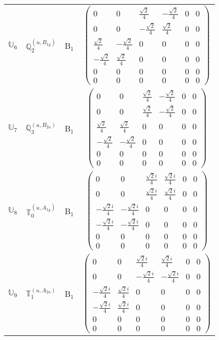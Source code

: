 \documentclass[fleqn,10pt,landscape]{article}
\begin{document}
\begin{itemize}
\begin{center}
\begin{longtable}{c|c|c|c}
$ \mathbb{U}_{6} $ & $\mathbb{Q}_{2}^{(u,B_{1g})}$ & B$_{1}$ & $\begin{pmatrix} 0 & 0 & \frac{\sqrt{2}}{4} & - \frac{\sqrt{2}}{4} & 0 & 0 \\ 0 & 0 & - \frac{\sqrt{2}}{4} & \frac{\sqrt{2}}{4} & 0 & 0 \\ \frac{\sqrt{2}}{4} & - \frac{\sqrt{2}}{4} & 0 & 0 & 0 & 0 \\ - \frac{\sqrt{2}}{4} & \frac{\sqrt{2}}{4} & 0 & 0 & 0 & 0 \\ 0 & 0 & 0 & 0 & 0 & 0 \\ 0 & 0 & 0 & 0 & 0 & 0 \end{pmatrix}$ \\
$ \mathbb{U}_{7} $ & $\mathbb{Q}_{3}^{(u,B_{2u})}$ & B$_{1}$ & $\begin{pmatrix} 0 & 0 & \frac{\sqrt{2}}{4} & - \frac{\sqrt{2}}{4} & 0 & 0 \\ 0 & 0 & \frac{\sqrt{2}}{4} & - \frac{\sqrt{2}}{4} & 0 & 0 \\ \frac{\sqrt{2}}{4} & \frac{\sqrt{2}}{4} & 0 & 0 & 0 & 0 \\ - \frac{\sqrt{2}}{4} & - \frac{\sqrt{2}}{4} & 0 & 0 & 0 & 0 \\ 0 & 0 & 0 & 0 & 0 & 0 \\ 0 & 0 & 0 & 0 & 0 & 0 \end{pmatrix}$ \\
$ \mathbb{U}_{8} $ & $\mathbb{T}_{0}^{(u,A_{1g})}$ & B$_{1}$ & $\begin{pmatrix} 0 & 0 & \frac{\sqrt{2} i}{4} & \frac{\sqrt{2} i}{4} & 0 & 0 \\ 0 & 0 & \frac{\sqrt{2} i}{4} & \frac{\sqrt{2} i}{4} & 0 & 0 \\ - \frac{\sqrt{2} i}{4} & - \frac{\sqrt{2} i}{4} & 0 & 0 & 0 & 0 \\ - \frac{\sqrt{2} i}{4} & - \frac{\sqrt{2} i}{4} & 0 & 0 & 0 & 0 \\ 0 & 0 & 0 & 0 & 0 & 0 \\ 0 & 0 & 0 & 0 & 0 & 0 \end{pmatrix}$ \\
$ \mathbb{U}_{9} $ & $\mathbb{T}_{1}^{(u,A_{2u})}$ & B$_{1}$ & $\begin{pmatrix} 0 & 0 & \frac{\sqrt{2} i}{4} & \frac{\sqrt{2} i}{4} & 0 & 0 \\ 0 & 0 & - \frac{\sqrt{2} i}{4} & - \frac{\sqrt{2} i}{4} & 0 & 0 \\ - \frac{\sqrt{2} i}{4} & \frac{\sqrt{2} i}{4} & 0 & 0 & 0 & 0 \\ - \frac{\sqrt{2} i}{4} & \frac{\sqrt{2} i}{4} & 0 & 0 & 0 & 0 \\ 0 & 0 & 0 & 0 & 0 & 0 \\ 0 & 0 & 0 & 0 & 0 & 0 \end{pmatrix}$ \\

\end{longtable}
\end{center}
\end{itemize}
\end{document}
